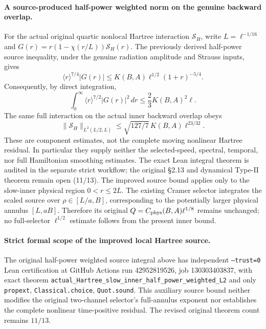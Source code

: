 \documentclass[11pt]{amsart}
\begin{document}
\paragraph{A source-produced half-power weighted norm on the genuine backward overlap.}
For the actual original quartic nonlocal Hartree interaction
\(\mathcal S_H\), write \(L=\ell^{-1/16}\) and
\(G(r)=r(1-\chi(r/L))\mathcal S_H(r)\).
The previously derived half-power source inequality, under the genuine
radiation amplitude and Strauss inputs, gives
\[
\langle r\rangle^{7/4}|G(r)|
\le K(B,A)\ell^{1/2}(1+r)^{-5/4}.
\]
Consequently, by direct integration,
\[
\int_0^\infty \langle r\rangle^{7/2}|G(r)|^2\,dr
\le\frac23K(B,A)^2\ell.
\]
The same full interaction on the actual inner backward overlap obeys
\[
\|\mathcal S_H\|_{L^2(L/2,L)}
\le \sqrt{127/7}\,K(B,A)\ell^{23/32}.
\]
These are component estimates, not the complete moving nonlinear
Hartree residual. In particular they supply neither the selected-speed,
spectral, temporal, nor full Hamiltonian smoothing estimates.
The exact Lean integral theorem is audited in the separate strict workflow;
the original §2.13 and dynamical Type-II theorem remain open (11/13).
The improved source bound applies only to the slow-inner physical region
\(0<r\le 2L\). The existing Cramer selector integrates the scaled
source over \(\rho\in[L/a,B]\), corresponding to the potentially larger
physical annulus \([L,aB]\). Therefore its original
\(Q=C_{\rm phys}(B,A)\ell^{1/8}\) remains unchanged; no full-selector
\(\ell^{1/2}\) estimate follows from the present inner bound.


\paragraph{Strict formal scope of the improved local Hartree source.}
The original half-power weighted source integral above has
independent \texttt{--trust=0} Lean certification at
GitHub Actions run 42952819526, job 130303403837,
with exact theorem \texttt{actual\_Hartree\_slow\_inner\_half\_power\_weighted\_L2}
and only \texttt{propext}, \texttt{Classical.choice}, \texttt{Quot.sound}.
This auxiliary source bound neither modifies the original
two-channel selector's full-annulus exponent nor establishes
the complete nonlinear time-positive residual. The revised
original theorem count remains $11/13$.
\end{document}
